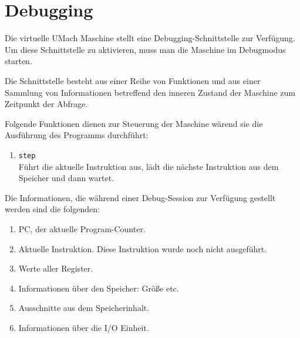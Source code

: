 \chapter{Debugging}
\label{chap:Debugging}

Die virtuelle UMach Maschine stellt eine Debugging-Schnittstelle zur Verfügung.
Um diese Schnittstelle zu aktivieren, muss man die Maschine im Debugmodus
starten.

Die Schnittstelle besteht aus einer Reihe von Funktionen und aus einer Sammlung
von Informationen betreffend den inneren Zustand der Maschine zum Zeitpunkt der
Abfrage.

Folgende Funktionen dienen zur Steuerung der Maschine wärend sie die Ausführung
des Programms durchführt:

\begin{enumerate}
 \item \texttt{step}\\
       Führt die aktuelle Instruktion aus, lädt die nächste Instruktion aus
       dem Speicher und dann wartet.
\end{enumerate}


Die Informationen, die während einer Debug-Session zur Verfügung gestellt
werden sind die folgenden:
\begin{enumerate}
 \item PC, der aktuelle Program-Counter.
 \item Aktuelle Instruktion. Diese Instruktion wurde noch nicht ausgeführt.
 \item Werte aller Register.
 \item Informationen über den Speicher: Größe etc.
 \item Ausschnitte aus dem Speicherinhalt.
 \item Informationen über die I/O Einheit.
\end{enumerate}

